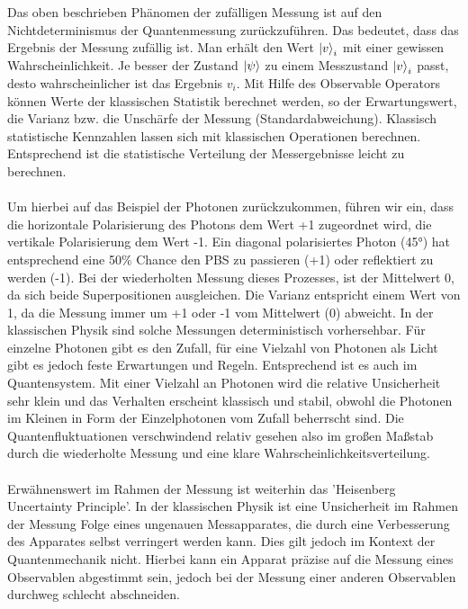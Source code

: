 Das oben beschrieben Phänomen der zufälligen Messung ist auf den Nichtdeterminismus der Quantenmessung zurückzuführen. Das bedeutet, dass das Ergebnis der Messung zufällig ist. Man erhält den Wert $\ket v_i$ mit einer gewissen Wahrscheinlichkeit.
Je besser der Zustand $\ket \psi$ zu einem Messzustand $\ket v_i$ passt, desto wahrscheinlicher ist das Ergebnis $v_i$. Mit Hilfe des Observable Operators können Werte der klassischen Statistik berechnet werden, so der Erwartungswert, die Varianz bzw. die Unschärfe der Messung (Standardabweichung). 
Klassisch statistische Kennzahlen lassen sich mit klassischen Operationen berechnen. Entsprechend ist die statistische Verteilung der Messergebnisse leicht zu berechnen. 
\\ \\
Um hierbei auf das Beispiel der Photonen zurückzukommen, führen wir ein, dass die horizontale Polarisierung des Photons dem Wert +1 zugeordnet wird, die vertikale Polarisierung dem Wert -1.
Ein diagonal polarisiertes Photon (45°) hat entsprechend eine 50\% Chance den PBS zu passieren (+1) oder reflektiert zu werden (-1). Bei der wiederholten Messung dieses Prozesses, ist der Mittelwert 0, da sich beide Superpositionen ausgleichen.
Die Varianz entspricht einem Wert von 1, da die Messung immer um +1 oder -1 vom Mittelwert (0) abweicht.
In der klassischen Physik sind solche Messungen deterministisch vorhersehbar. Für einzelne Photonen gibt es den Zufall, für eine Vielzahl von Photonen als Licht gibt es jedoch feste Erwartungen und Regeln.
Entsprechend ist es auch im Quantensystem. Mit einer Vielzahl an Photonen wird die relative Unsicherheit sehr klein und das Verhalten erscheint klassisch und stabil, obwohl die Photonen im Kleinen in Form der Einzelphotonen vom Zufall beherrscht sind.
Die Quantenfluktuationen verschwindend relativ gesehen also im großen Maßstab durch die wiederholte Messung und eine klare Wahrscheinlichkeitsverteilung.
\cite{kasirajan_fundamentals_2021}
\\ \\
Erwähnenswert im Rahmen der Messung ist weiterhin das 'Heisenberg Uncertainty Principle'. In der klassischen Physik ist eine Unsicherheit im Rahmen der Messung Folge eines ungenauen Messapparates, die durch eine Verbesserung des Apparates selbst verringert werden kann.
Dies gilt jedoch im Kontext der Quantenmechanik nicht. Hierbei kann ein Apparat präzise auf die Messung eines Observablen abgestimmt sein, jedoch bei der Messung einer anderen Observablen durchweg schlecht abschneiden. \\
